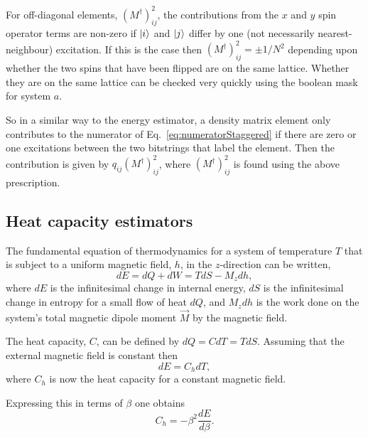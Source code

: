 For off-diagonal elements, $(M^{\dagger})^2_{ij}$, the contributions from the $x$ and $y$ spin operator terms are non-zero if $\ket{i}$ and $\ket{j}$ differ by one (not necessarily nearest-neighbour) excitation. If this is the case then $(M^{\dagger})^2_{ij} = \pm 1/N^2$ depending upon whether the two spins that have been flipped are on the same lattice. Whether they are on the same lattice can be checked very quickly using the boolean mask for system $a$.

So in a similar way to the energy estimator, a density matrix element only contributes to the numerator of Eq.~\ref{eq:numeratorStaggered} if there are zero or one excitations between the two bitstrings that label the element. Then the contribution is given by $q_{ij}(M^{\dagger})^2_{ij}$, where $(M^{\dagger})^2_{ij}$ is found using the above prescription.



\subsection{Heat capacity estimators}
\label{sec:heatCapacity}
The fundamental equation of thermodynamics for a system of temperature $T$ that is subject to a uniform magnetic field, $h$, in the $z$-direction can be written,
\begin{equation}
dE = dQ + dW = TdS-M_zdh,
\end{equation}
where $dE$ is the infinitesimal change in internal energy, $dS$ is the infinitesimal change in entropy for a small flow of heat $dQ$, and $M_zd h$ is the work done on the system's total magnetic dipole moment $\vec{M}$ by the magnetic field.

The heat capacity, $C$, can be defined by $dQ=CdT=TdS$. Assuming that the external magnetic field is constant then
\begin{equation}
dE = C_{h}dT,
\end{equation}
where $C_{h}$ is now the heat capacity for a constant magnetic field.

Expressing this in terms of $\beta$ one obtains
\begin{equation}
C_{h} = -\beta^2\frac{dE}{d\beta}.
\end{equation}

